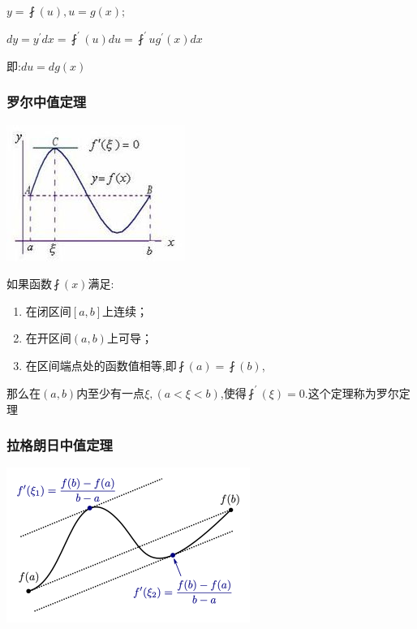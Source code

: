 \documentclass[UTF8,12pt]{ctexbook}
\newcommand{\derivative}{^\prime}
\begin{document}
{{{{  $y = \fint(u), u = g(x);$

  $dy = y\derivative dx = \fint\derivative(u)du = \fint\derivative{u}g\derivative(x)dx$

  即:$du = dg(x)$
}%

\subsubsection{罗尔中值定理}{
  \begin{center}
    \includegraphics{resources/Rolle's_mean_value_theorem.jpg}
  \end{center}

  如果函数$\fint(x)$满足:

  \begin{enumerate}
    \item 在闭区间$[a,b]$上连续；
    \item 在开区间$(a,b)$上可导；
    \item 在区间端点处的函数值相等,即$\fint(a) = \fint(b)$,
  \end{enumerate}

  那么在$(a,b)$内至少有一点$\xi, (a<\xi<b)$,使得$\fint\derivative(\xi) = 0$.这个定理称为罗尔定理
}%

\subsubsection{拉格朗日中值定理}{
\begin{center}
  \includegraphics{resources/Lagrange's_mean_value_theorem.png}
\end{center}

}}}}
\end{document}
